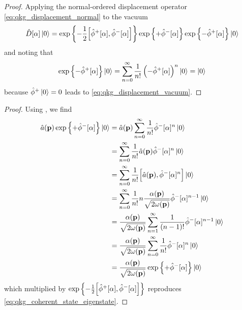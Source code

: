 \qkgdisplacementvacuum
\begin{proof}
	Applying the normal-ordered displacement operator \cref{eq:qkg_displacement_normal} to the vacuum
	\begin{equation*}
		\hat{D}[\alpha]
		\ket{0}
		=
		\exp\left\{
			-
			\frac{1}{2}
			\comm{\hat\phi^+[\alpha]}{\hat\phi^-[\alpha]}
		\right\}
		\exp\left\{
			+
			\hat\phi^-[\alpha]
		\right\}
		\exp\left\{
			-
			\hat\phi^+[\alpha]
		\right\}
		\ket{0}
	\end{equation*}
	and noting that
	\begin{equation*}
		\exp\left\{
			-
			\hat\phi^+[\alpha]
		\right\}
		\ket{0}
		=
		\sum_{n=0}^\infty
		\frac{1}{n!}
		\left(
			-
			\hat\phi^+[\alpha]
		\right)^n
		\ket{0}
		=
		\ket{0}
	\end{equation*}
	because $\hat\phi^+\ket{0}=0$ leads to \cref{eq:qkg_displacement_vacuum}.
\end{proof}
\qkgcoherenteigenstate
\begin{proof}
	Using , we find
	\begin{equation*}
		\begin{split}
			\hat{a}(\vb{p})
			\exp\left\{
				+
				\hat\phi^-[\alpha]
			\right\}
			\ket{0}
			&=
			\hat{a}(\vb{p})
			\sum_{n=0}^\infty
			\frac{1}{n!}
			\hat\phi^-[\alpha]^n
			\ket{0}
			\\
			&=
			\sum_{n=0}^\infty
			\frac{1}{n!}
			\hat{a}(\vb{p})
			\hat\phi^-[\alpha]^n
			\ket{0}
			\\
			&=
			\sum_{n=0}^\infty
			\frac{1}{n!}
			\comm{\hat{a}(\vb{p})}{\hat\phi^-[\alpha]^n}
			\ket{0}
			\\
			&=
			\sum_{n=0}^\infty
			\frac{1}{n!}
			n
			\frac{\alpha(\vb{p})}{\sqrt{2\omega(\vb{p})}}
			\hat\phi^-[\alpha]^{n-1}
			\ket{0}
			\\
			&=
			\frac{\alpha(\vb{p})}{\sqrt{2\omega(\vb{p})}}
			\sum_{n=1}^\infty
			\frac{1}{(n-1)!}
			\hat\phi^-[\alpha]^{n-1}
			\ket{0}
			\\
			&=
			\frac{\alpha(\vb{p})}{\sqrt{2\omega(\vb{p})}}
			\sum_{n=0}^\infty
			\frac{1}{n!}
			\hat\phi^-[\alpha]^{n}
			\ket{0}
			\\
			&=
			\frac{\alpha(\vb{p})}{\sqrt{2\omega(\vb{p})}}
			\exp\left\{
				+
				\hat\phi^-[\alpha]
			\right\}
			\ket{0}
		\end{split}
	\end{equation*}
	which multiplied by $\exp\left\{-\frac{1}{2}\comm{\hat\phi^+[\alpha]}{\hat\phi^-[\alpha]}\right\}$ reproduces \cref{eq:qkg_coherent_state_eigenstate}.
\end{proof}

